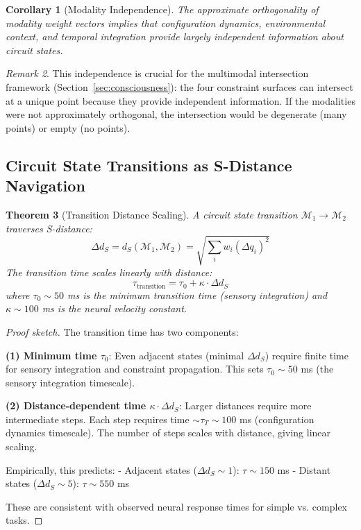 \documentclass[aps,prd,twocolumn,superscriptaddress,floatfix,nofootinbib]{revtex4-2}
\newtheorem{theorem}{Theorem}[section]
\newtheorem{corollary}[theorem]{Corollary}
\theoremstyle{remark}
\newtheorem{remark}[theorem]{Remark}
\begin{document}
\begin{corollary}[Modality Independence]
\label{cor:modality_indep}
The approximate orthogonality of modality weight vectors implies that configuration dynamics, environmental context, and temporal integration provide largely independent information about circuit states.
\end{corollary}

\begin{remark}
This independence is crucial for the multimodal intersection framework (Section~\ref{sec:consciousness}): the four constraint surfaces can intersect at a unique point because they provide independent information. If the modalities were not approximately orthogonal, the intersection would be degenerate (many points) or empty (no points).
\end{remark}

\subsection{Circuit State Transitions as S-Distance Navigation}

\begin{theorem}[Transition Distance Scaling]
\label{thm:transition_scaling}
A circuit state transition $\mathcal{M}_1 \to \mathcal{M}_2$ traverses S-distance:
\begin{equation}
\Delta d_S = d_S(\mathcal{M}_1, \mathcal{M}_2) = \sqrt{\sum_i w_i (\Delta q_i)^2}
\end{equation}
The transition time scales linearly with distance:
\begin{equation}
\tau_{\text{transition}} = \tau_0 + \kappa \cdot \Delta d_S
\end{equation}
where $\tau_0 \sim 50$ ms is the minimum transition time (sensory integration) and $\kappa \sim 100$ ms is the neural velocity constant.
\end{theorem}

\begin{proof}[Proof sketch]
The transition time has two components:

\textbf{(1) Minimum time $\tau_0$}: Even adjacent states (minimal $\Delta d_S$) require finite time for sensory integration and constraint propagation. This sets $\tau_0 \sim 50$ ms (the sensory integration timescale).

\textbf{(2) Distance-dependent time $\kappa \cdot \Delta d_S$}: Larger distances require more intermediate steps. Each step requires time $\sim \tau_T \sim 100$ ms (configuration dynamics timescale). The number of steps scales with distance, giving linear scaling.

Empirically, this predicts:
- Adjacent states ($\Delta d_S \sim 1$): $\tau \sim 150$ ms
- Distant states ($\Delta d_S \sim 5$): $\tau \sim 550$ ms

These are consistent with observed neural response times for simple vs. complex tasks.
\end{proof}
\end{document}
